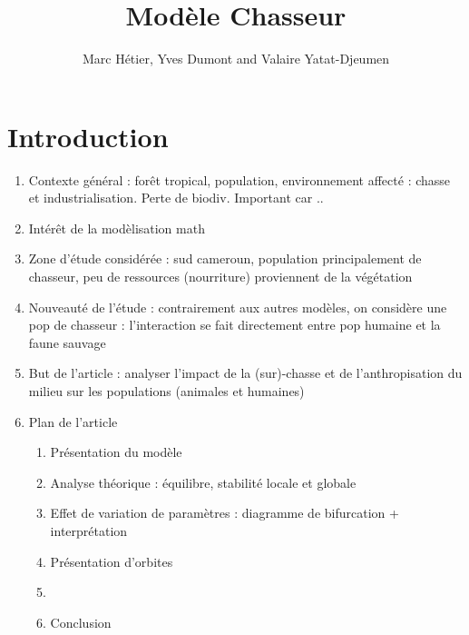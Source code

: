 \documentclass{article}
\title{Modèle Chasseur}
\author{Marc Hétier, Yves Dumont  and Valaire Yatat-Djeumen}
\newcommand{\marc}[1]{\textcolor{teal}{#1}}
\newcommand{\YD}[1]{\textcolor{magenta}{#1}}
\begin{document}
\maketitle

\section{Introduction}

\begin{enumerate}
\item Contexte général : forêt tropical, population, environnement affecté : chasse et industrialisation. Perte de biodiv. Important car ..
\item  Intérêt de la modèlisation math
\item Zone d'étude considérée : sud cameroun, population principalement de chasseur, peu de ressources (nourriture) proviennent de la végétation
\item Nouveauté de l'étude : contrairement aux autres modèles, on considère une pop de chasseur : l'interaction se fait directement entre pop humaine et la faune sauvage
\item But de l'article : analyser l'impact de la (sur)-chasse et de l'anthropisation du milieu sur les populations (animales et humaines)
\item Plan de l'article

\begin{enumerate}
\item Présentation du modèle
\item Analyse théorique : équilibre, stabilité locale et globale
\item Effet de variation de paramètres : diagramme de bifurcation + interprétation
\item Présentation d'orbites
\item 
\item Conclusion
\end{enumerate}
\end{enumerate}

\end{document}
